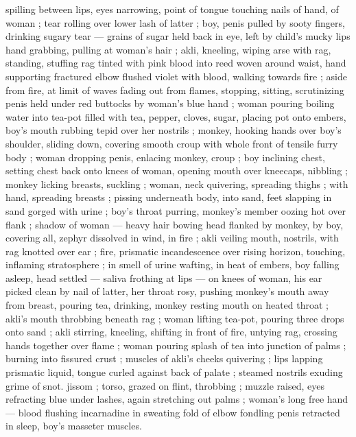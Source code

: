 spilling between lips, eyes narrowing, point of tongue touching nails 
of hand, of woman ; tear rolling over lower lash of latter ; boy, penis 
pulled by sooty fingers, drinking sugary tear --- grains of sugar held 
back in eye, left by child's mucky lips {\dashcom} hand grabbing, pulling at 
woman's hair ; akli, kneeling, wiping arse with rag, standing, stuffing 
rag tinted with pink blood into reed woven around waist, hand 
supporting fractured elbow flushed violet with blood, walking 
towards fire ; aside from fire, at limit of waves fading out from 
flames, stopping, sitting, scrutinizing penis held under red buttocks 
by woman's blue hand ; woman pouring boiling water into tea-pot 
filled with tea, pepper, cloves, sugar, placing pot onto embers, boy's 
mouth rubbing tepid over her nostrils ; monkey, hooking hands over 
boy's shoulder, sliding down, covering smooth croup with whole front 
of tensile furry body ; woman dropping penis, enlacing monkey, 
croup ; boy inclining chest, setting chest back onto knees of woman, 
opening mouth over kneecaps, nibbling ; monkey licking breasts, 
suckling ; woman, neck quivering, spreading thighs ; with hand, 
spreading breasts ; pissing underneath body, into sand, feet 
slapping in sand gorged with urine ; boy's throat purring, monkey's 
member oozing hot over flank ; shadow of woman --- heavy hair 
bowing head {\dashcom} flanked by monkey, by boy, covering all, zephyr 
dissolved in wind, in fire ; akli veiling mouth, nostrils, with rag 
knotted over ear ; fire, prismatic incandescence over rising horizon, 
touching, inflaming stratosphere ; in smell of urine wafting, in heat 
of embers, boy falling asleep, head settled --- saliva frothing at lips 
--- on knees of woman, his ear picked clean by nail of latter, her 
throat rosy, pushing monkey's mouth away from breast, pouring tea, 
drinking, monkey resting mouth on heated throat ; akli's mouth 
throbbing beneath rag ; woman lifting tea-pot, pouring three drops 
onto sand ; akli stirring, kneeling, shifting in front of fire, untying 
rag, crossing hands together over flame ; woman pouring splash of 
tea into junction of palms ; burning into fissured crust ; muscles of 
akli's cheeks quivering ; lips lapping prismatic liquid, tongue curled 
against back of palate ; steamed nostrils exuding grime of snot. 
jissom ; torso, grazed on flint, throbbing ; muzzle raised, eyes 
refracting blue under lashes, again stretching out palms ; woman's 
long free hand --- blood flushing incarnadine in sweating fold of 
elbow fondling penis retracted in sleep, boy's masseter muscles. 
